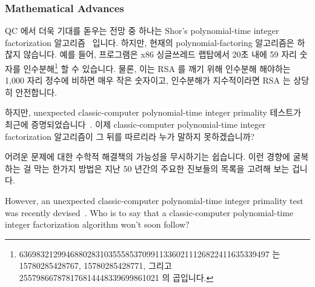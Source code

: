 \subsubsection{Mathematical Advances}
\label{sec:future:Mathematical Advances}

QC 에서 더욱 기대를 돋우는 전망 중 하나는 Shor's polynomial-time integer
factorization
알고리즘~\cite{Shor:1997:PAP:264393.264406,WikipediaShorsAlgorithm} 입니다.
하지만, 현재의 polynomial-factoring 알고리즘은 하찮지 않습니다.
예를 들어,  프로그램은 x86 싱글쓰레드 랩탑에서 20초 내에 59 자리
숫자를 인수분해\footnote{
	\scriptsize
	63698321299468802831035558537099113360211126822411635339497 는
	15780285428767, 15780285428771, 그리고
	255798667878176814448339699861021 의 곱입니다.}
할 수 있습니다.
물론, 이는 RSA 를 깨기 위해 인수분해 해야하는 1,000 자리 정수에 비하면 매우
작은 숫자이고, 인수분해가 지수적이라면 RSA 는 상당히 안전합니다.

하지만, unexpected classic-computer polynomial-time integer primality 테스트가
최근에
증명되었습니다~\cite{ManindraAgrawal2004PrimesIsInP,WikipediaAKSPrimalityTest}.
이제 classic-computer polynomial-time integer factorization 알고리즘이 그 뒤를
따르리라 누가 말하지 못하겠습니까?

어려운 문제에 대한 수학적 해결책의 가능성을 무시하기는 쉽습니다.
이런 경향에 굴복하는 걸 막는 한가지 방법은 지난 50 년간의 주요한 진보들의
목록을 고려해 보는 겁니다.
\iffalse

However, an unexpected classic-computer
polynomial-time integer primality test was recently
devised~\cite{ManindraAgrawal2004PrimesIsInP,WikipediaAKSPrimalityTest}.
Who is to say that a classic-computer polynomial-time integer
factorization algorithm won't soon follow?

